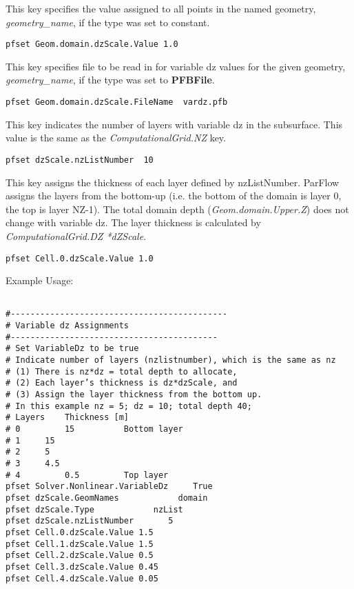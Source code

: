{
This key specifies the value assigned to all points in the named
geometry, {\em geometry\_name}, if the type was set to constant.
}
\begin{display}\begin{verbatim}
pfset Geom.domain.dzScale.Value 1.0
\end{verbatim}\end{display}

{
This key specifies file to be read in for variable dz values for the given
geometry, {\em geometry\_name}, if the type was set to {\bf PFBFile}.
}
\begin{display}\begin{verbatim}
pfset Geom.domain.dzScale.FileName  vardz.pfb
\end{verbatim}\end{display}

{
This key indicates the number of layers with variable dz in the subsurface.
This value is the same as the \emph{ComputationalGrid.NZ} key.
}
\begin{display}\begin{verbatim}
pfset dzScale.nzListNumber  10
\end{verbatim}\end{display}


{
This key assigns the thickness of each layer defined by nzListNumber.
ParFlow assigns the layers from the bottom-up (i.e. the bottom
of the domain is layer 0, the top is layer NZ-1). The total domain depth
(\emph{Geom.domain.Upper.Z}) does not change with variable dz. The layer thickness
is calculated by \emph{ComputationalGrid.DZ *dZScale}.
}
\begin{display}\begin{verbatim}
pfset Cell.0.dzScale.Value 1.0
\end{verbatim}\end{display}

Example Usage:
\begin{display}\begin{verbatim}

#--------------------------------------------
# Variable dz Assignments
#------------------------------------------
# Set VariableDz to be true
# Indicate number of layers (nzlistnumber), which is the same as nz
# (1) There is nz*dz = total depth to allocate,
# (2) Each layer’s thickness is dz*dzScale, and
# (3) Assign the layer thickness from the bottom up.
# In this example nz = 5; dz = 10; total depth 40;
# Layers 	Thickness [m]
# 0 		15 			Bottom layer
# 1		15
# 2		5
# 3		4.5
# 4 		0.5			Top layer
pfset Solver.Nonlinear.VariableDz     True
pfset dzScale.GeomNames            domain
pfset dzScale.Type            nzList
pfset dzScale.nzListNumber       5
pfset Cell.0.dzScale.Value 1.5
pfset Cell.1.dzScale.Value 1.5
pfset Cell.2.dzScale.Value 0.5
pfset Cell.3.dzScale.Value 0.45
pfset Cell.4.dzScale.Value 0.05
\end{verbatim}\end{display}

